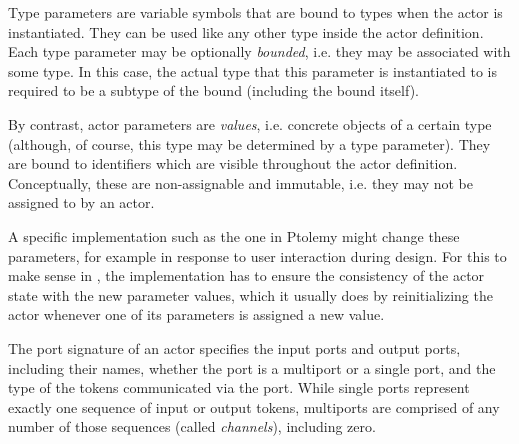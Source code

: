 Type parameters are variable symbols that
are bound to types when the actor is instantiated. They can be used
like any other type inside the actor definition. Each type parameter
may be optionally {\em bounded}, i.e. they may
be associated with some type. In this case, the actual type that this
parameter is instantiated to is required to be a subtype of the bound
(including the bound itself).

By contrast, actor parameters are {\em values}, i.e. concrete objects
of a certain type (although, of course, this type may be determined by
a type parameter). They are bound to identifiers which are visible
throughout the actor definition. Conceptually, these are
non-assignable and immutable, i.e. they may not be assigned to by an
actor. 

\begin{implementation}
  A specific implementation such as the one in Ptolemy might change
  these parameters, for example in response to user interaction during
  design. For this to make sense in \Cal, the implementation has
  to ensure the consistency of the actor state with the new parameter
  values, which it usually does by reinitializing the actor whenever
  one of its parameters is assigned a new value.
\end{implementation}

The port signature of an actor specifies the input ports and output ports,
including their names, whether the port is a multiport or a single
port, and the type of the tokens communicated via the
port.  While
single ports represent exactly one sequence of input or output tokens,
multiports are comprised of any number of those sequences (called {\em
  channels}), including zero.




